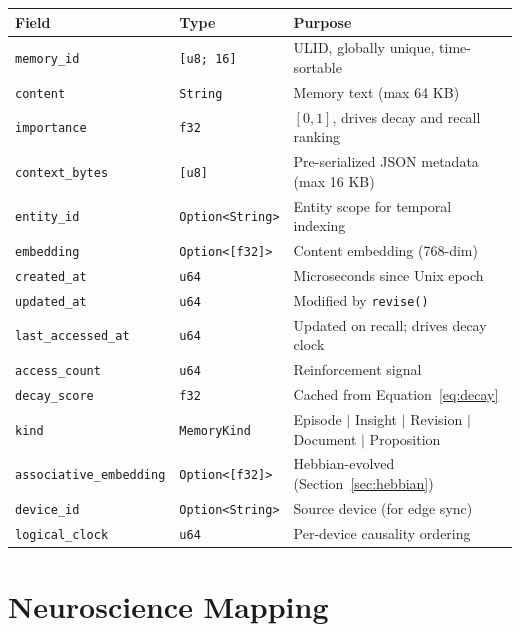 \documentclass{article}
\begin{document}
\begin{table}[h]
\centering
\small
\begin{tabular}{@{}lll@{}}
\toprule
\textbf{Field} & \textbf{Type} & \textbf{Purpose} \\
\midrule
\texttt{memory\_id} & \texttt{[u8; 16]} & ULID, globally unique, time-sortable \\
\texttt{content} & \texttt{String} & Memory text (max 64 KB) \\
\texttt{importance} & \texttt{f32} & $[0, 1]$, drives decay and recall ranking \\
\texttt{context\_bytes} & \texttt{[u8]} & Pre-serialized JSON metadata (max 16 KB) \\
\texttt{entity\_id} & \texttt{Option<String>} & Entity scope for temporal indexing \\
\texttt{embedding} & \texttt{Option<[f32]>} & Content embedding (768-dim) \\
\texttt{created\_at} & \texttt{u64} & Microseconds since Unix epoch \\
\texttt{updated\_at} & \texttt{u64} & Modified by \texttt{revise()} \\
\texttt{last\_accessed\_at} & \texttt{u64} & Updated on recall; drives decay clock \\
\texttt{access\_count} & \texttt{u64} & Reinforcement signal \\
\texttt{decay\_score} & \texttt{f32} & Cached from Equation~\ref{eq:decay} \\
\texttt{kind} & \texttt{MemoryKind} & Episode $|$ Insight $|$ Revision $|$ Document $|$ Proposition \\
\texttt{associative\_embedding} & \texttt{Option<[f32]>} & Hebbian-evolved (Section~\ref{sec:hebbian}) \\
\texttt{device\_id} & \texttt{Option<String>} & Source device (for edge sync) \\
\texttt{logical\_clock} & \texttt{u64} & Per-device causality ordering \\
\bottomrule
\end{tabular}
\end{table}

\section{Neuroscience Mapping}
\label{app:neuro}
\end{document}
